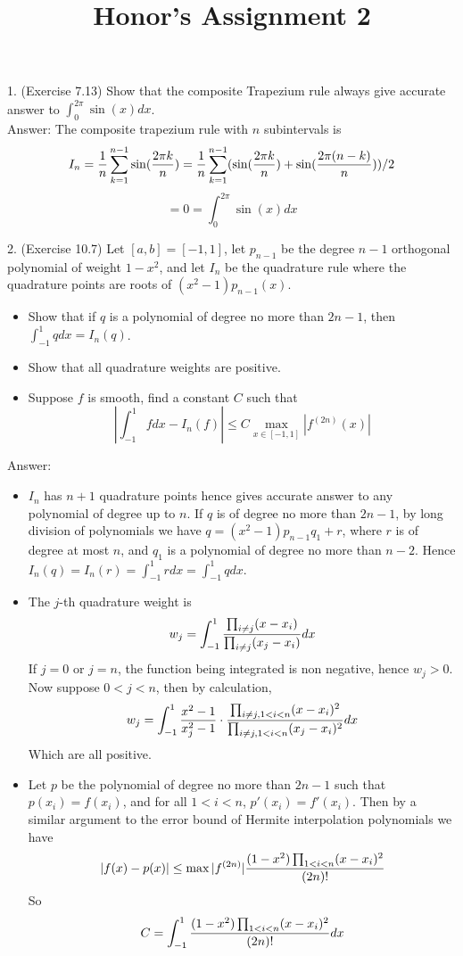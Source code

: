 \documentclass[20pt]{article} %
\title{Honor's Assignment 2}
\theoremstyle{break}
\begin{document}
\maketitle

1. (Exercise 7.13) Show that the composite Trapezium rule always give accurate answer to $\int_0^{2\pi}\sin(x)dx$.\\  

Answer: The composite trapezium rule with $n$ subintervals is
\[I_n={1\over n}\sum_{k=1}^{n-1}\sin({2\pi k\over n})={1\over n}\sum_{k=1}^{n-1}(\sin({2\pi k\over n})+\sin({2\pi(n-k)\over n}))/2\]
\[=0=\int_0^{2\pi}\sin(x)dx\]

2. (Exercise 10.7) Let $[a, b]=[-1, 1]$, let $p_{n-1}$ be the degree $n-1$ orthogonal polynomial of weight $1-x^2$, and let $I_n$ be the quadrature rule where the quadrature points are roots of $(x^2-1)p_{n-1}(x)$.
\begin{itemize}
\item Show that if $q$ is a polynomial of degree no more than $2n-1$, then $\int_{-1}^1qdx=I_n(q)$.
\item Show that all quadrature weights are positive.
\item Suppose $f$ is smooth, find a constant $C$ such that
  \[|\int_{-1}^1fdx-I_n(f)|\leq C\max_{x\in [-1, 1]}|f^{(2n)}(x)|\]
\end{itemize}

Answer:\\

\begin{itemize}
\item $I_n$ has $n+1$ quadrature points hence gives accurate answer to any polynomial of degree up to $n$. If $q$ is of degree no more than $2n-1$, by long division of polynomials we have $q=(x^2-1)p_{n-1}q_1+r$, where $r$ is of degree at most $n$, and $q_1$ is a polynomial of degree no more than $n-2$. Hence $I_n(q)=I_n(r)=\int_{-1}^1rdx=\int_{-1}^1qdx$.  
\item The $j$-th quadrature weight is
  \[w_j=\int_{-1}^1 {\prod_{i\not=j}(x-x_i)\over \prod_{i\not=j}(x_j-x_i)}dx\]
  If $j=0$ or $j=n$, the function being integrated is non negative, hence $w_j>0$. Now suppose $0<j<n$, then by calculation,
  \[w_j=\int_{-1}^1{x^2-1\over x_j^2-1}\cdot {\prod_{i\not=j, 1<i<n}(x-x_i)^2\over \prod_{i\not=j, 1<i<n}(x_j-x_i)^2}dx\]
  Which are all positive.
\item Let $p$ be the polynomial of degree no more than $2n-1$ such that $p(x_i)=f(x_i)$, and for all $1<i<n$, $p'(x_i)=f'(x_i)$. Then by a similar argument to the error bound of Hermite interpolation polynomials we have
  \[|f(x)-p(x)|\leq \max|f^{(2n)}|{(1-x^2)\prod_{1<i<n}(x-x_i)^2\over (2n)!}\]
  So
  \[C=\int_{-1}^1 {(1-x^2)\prod_{1<i<n}(x-x_i)^2\over (2n)!}dx\]
\end{itemize}
\end{document}

